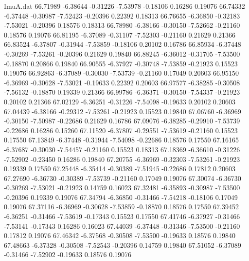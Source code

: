 \begin{filecontents}{ImuA.dat}
  66.71989   -6.38644   -0.31226   -7.53978   -0.18106    0.16286    0.19076
  66.74332   -6.37448   -0.30987   -7.52423   -0.20396    0.22392    0.18313
  66.76655   -6.36850   -0.32183   -7.53021   -0.20396    0.18576    0.18313
  66.78980   -6.38166   -0.30150   -7.52662   -0.21160    0.18576    0.19076
  66.81195   -6.37089   -0.31107   -7.52303   -0.21160    0.21629    0.21366
  66.83524   -6.37807   -0.31944   -7.53859   -0.18106    0.20102    0.16786
  66.85934   -6.37448   -0.30269   -7.53261   -0.20396    0.21629    0.19840
  66.88245   -6.36012   -0.31705   -7.53500   -0.18870    0.20866    0.19840
  66.90555   -6.37927   -0.30748   -7.53859   -0.21923    0.15523    0.19076
  66.92863   -6.37089   -0.30030   -7.53739   -0.21160    0.17049    0.20603
  66.95150   -6.36969   -0.30628   -7.53021   -0.19633    0.22392    0.20603
  66.97577   -6.38285   -0.30508   -7.56132   -0.18870    0.19339    0.21366
  66.99786   -6.36371   -0.30150   -7.54337   -0.21923    0.20102    0.21366
  67.02129   -6.36251   -0.31226   -7.54098   -0.19633    0.20102    0.20603
  67.04439   -6.38166   -0.29312   -7.53261   -0.21923    0.15523    0.19840
  67.06760   -6.36969   -0.30150   -7.50987   -0.22686    0.21629    0.16786
  67.09076   -6.38285   -0.29910   -7.53739   -0.22686    0.16286    0.15260
  67.11520   -6.37807   -0.29551   -7.53619   -0.21160    0.15523    0.17550
  67.13849   -6.37448   -0.31944   -7.54098   -0.22686    0.18576    0.17550
  67.16165   -6.37687   -0.30030   -7.54457   -0.21160    0.15523    0.18313
  67.18369   -6.36610   -0.31226   -7.52902   -0.23450    0.16286    0.19840
  67.20755   -6.36969   -0.32303   -7.53261   -0.21923    0.19339    0.17550
  67.25448   -6.35414   -0.30389   -7.51945   -0.22686    0.17812    0.20603
  67.27690   -6.36730   -0.30389   -7.53739   -0.21160    0.17049    0.19076
  67.30074   -6.36730   -0.30269   -7.53021   -0.21923    0.14759    0.16023
  67.32481   -6.35893   -0.30987   -7.53500   -0.20396    0.19339    0.19076
  67.34794   -6.36850   -0.31466   -7.54218   -0.18106    0.17049    0.19076
  67.37116   -6.36969   -0.30628   -7.53859   -0.18870    0.18576    0.17550
  67.39452   -6.36251   -0.31466   -7.53619   -0.17343    0.15523    0.17550
  67.41746   -6.37927   -0.31466   -7.53141   -0.17343    0.16286    0.16023
  67.44039   -6.37448   -0.31346   -7.53500   -0.21160    0.17812    0.19076
  67.46342   -6.37568   -0.30508   -7.53500   -0.19633    0.18576    0.19840
  67.48663   -6.37328   -0.30508   -7.52543   -0.20396    0.14759    0.19840
  67.51052   -6.37089   -0.31466   -7.52902   -0.19633    0.18576    0.19076

\end{filecontents}
